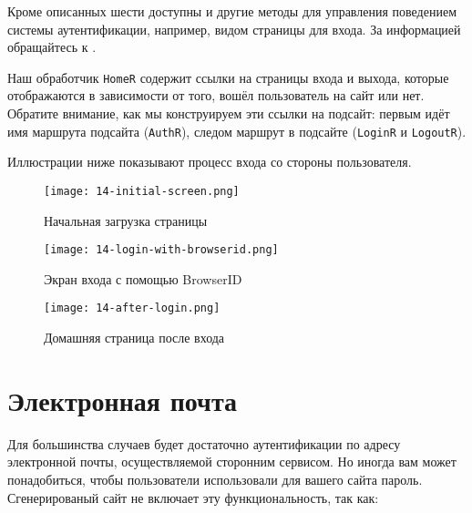 Кроме описанных шести доступны и другие методы для управления поведением системы аутентификации, например, видом страницы для входа. За информацией обращайтесь к .

Наш обработчик \lstinline'HomeR' содержит ссылки на страницы входа и выхода, которые отображаются в зависимости от того, вошёл пользователь на сайт или нет. Обратите внимание, как мы конструируем эти ссылки на подсайт: первым идёт имя маршрута подсайта (\lstinline'AuthR'), следом маршрут в подсайте (\lstinline'LoginR' и \lstinline'LogoutR').

Иллюстрации ниже показывают процесс входа со стороны пользователя.

\begin{figure}[h!]
  \centering
  \texttt{[image: 14-initial-screen.png]}
  \caption{Начальная загрузка страницы}
\end{figure}

\begin{figure}[h!]
  \centering
  \texttt{[image: 14-login-with-browserid.png]}
  \caption{Экран входа с помощью BrowserID}
\end{figure}

\begin{figure}[h!]
  \centering
  \texttt{[image: 14-after-login.png]}
  \caption{Домашняя страница после входа}
\end{figure}

\section{Электронная почта}

Для большинства случаев будет достаточно аутентификации по адресу электронной почты, осуществляемой сторонним сервисом. Но иногда вам может понадобиться, чтобы пользователи использовали для вашего сайта пароль. Сгенерированый сайт не включает эту функциональность, так как:

